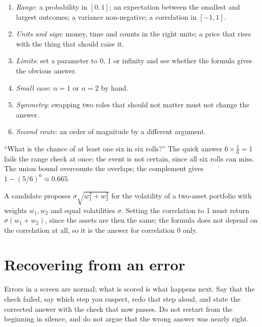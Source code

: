 \begin{method}\label{met:iv:phone-and-technical-screens:checks}
\begin{enumerate}
\item \emph{Range}: a probability in $[0,1]$; an expectation between the smallest and largest outcomes; a
variance non-negative; a correlation in $[-1,1]$.
\item \emph{Units and sign}: money, time and counts in the right units; a price that rises with the thing
that should raise it.
\item \emph{Limits}: set a parameter to 0, 1 or infinity and see whether the formula gives the obvious answer.
\item \emph{Small case}: $n = 1$ or $n = 2$ by hand.
\item \emph{Symmetry}: swapping two roles that should not matter must not change the answer.
\item \emph{Second route}: an order of magnitude by a different argument.
\end{enumerate}
\end{method}

\begin{example}\label{ex:iv:phone-and-technical-screens:six}
``What is the chance of at least one six in six rolls?'' The quick answer $6 \times \tfrac16 = 1$ fails the
range check at once: the event is not certain, since all six rolls can miss. The union bound overcounts the
overlaps; the complement gives $1 - (5/6)^6 \approx 0.665$.
\end{example}

\begin{example}\label{ex:iv:phone-and-technical-screens:limit}
A candidate proposes $\sigma\sqrt{w_1^2 + w_2^2}$ for the volatility of a two-asset portfolio with weights
$w_1, w_2$ and equal volatilities $\sigma$. Setting the correlation to 1 must return $\sigma(w_1 + w_2)$, since the
assets are then the same; the formula does not depend on the correlation at all, so it is the answer for
correlation 0 only.
\end{example}

\section{Recovering from an error}

Errors in a screen are normal; what is scored is what happens next. Say that the check failed, say which
step you suspect, redo that step aloud, and state the corrected answer with the check that now passes. Do not
restart from the beginning in silence, and do not argue that the wrong answer was nearly right.

